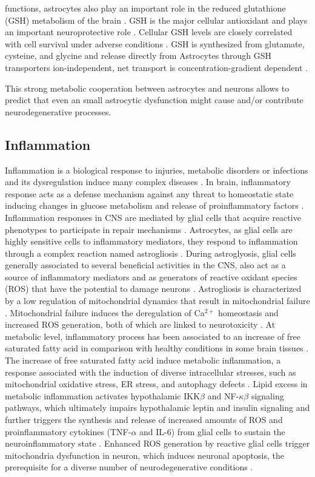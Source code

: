 functions, astrocytes also play an important role in the reduced glutathione (GSH) metabolism of the brain \cite{Raps1989}. GSH is the major cellular antioxidant and plays an important neuroprotective role \cite{Jha2016}. Cellular GSH levels are closely correlated with cell survival under adverse conditions \cite{Allaman2011}. GSH is synthesized from glutamate, cysteine, and glycine and release directly from Astrocytes through GSH transporters ion-independent, net transport is concentration-gradient dependent \cite{Wang2000}.

This strong metabolic cooperation between astrocytes and neurons allows to predict that even an small astrocytic dysfunction might cause and/or contribute neurodegenerative processes.

\subsection*{Inflammation}
Inflammation is a biological response to injuries, metabolic disorders or infections and its dysregulation induce many complex diseases \cite{Masel2010,Yan2013,Jha2016}. In brain, inflammatory response acts as a defense mechanism against any threat to homeostatic state inducing changes in glucose metabolism and release of proinflammatory factors \cite{Allaman2011}. Inflammation responses in CNS are mediated by glial cells that acquire reactive phenotypes to participate in repair mechanisms \cite{Takuma2004,Fitch2008,Jha2016}. Astrocytes, as glial cells are highly sensitive cells to inflammatory mediators, they respond to inflammation through a complex reaction named astrogliosis \cite{Dowell2009a}. During astroglyosis,  glial cells generally associated to several beneficial activities in the CNS, also act as a source of inflammatory mediators and as generators of reactive oxidant species (ROS) that have the potential to damage neurons \cite{Molofsk2012}. Astrogliosis is characterized by a low regulation of mitochondrial dynamics that result in mitochondrial failure \cite{Sidoryk-Wegrzynowicz2013}.  Mitochondrial failure induces the deregulation of Ca$^{2+}$ homeostasis and increased ROS generation, both of which are linked to neurotoxicity \cite{Lange2012}. At metabolic level, inflammatory process has been associated to an increase of free saturated fatty acid in comparison with healthy conditions in some brain tissues \cite{Gupta2012}. The increase of free saturated fatty acid induce metabolic inflammation, a response associated with the induction of diverse intracellular stresses, such as mitochondrial oxidative stress, ER stress, and autophagy defects \cite{Jha2016}. Lipid excess in metabolic inflammation activates hypothalamic IKK$\beta$ and NF-$\kappa\beta$ signaling pathways, which ultimately impairs hypothalamic leptin and insulin signaling and further triggers the synthesis and release of increased amounts of ROS and proinflammatory cytokines (TNF-$\alpha$ and IL-6) from glial cells to sustain the neuroinflammatory state \cite{Purkayastha2015}. Enhanced ROS generation by reactive glial cells trigger mitochondria dysfunction in neuron, which induces neuronal apoptosis, the prerequisite for a diverse number of neurodegenerative conditions \cite{K.2006}.
